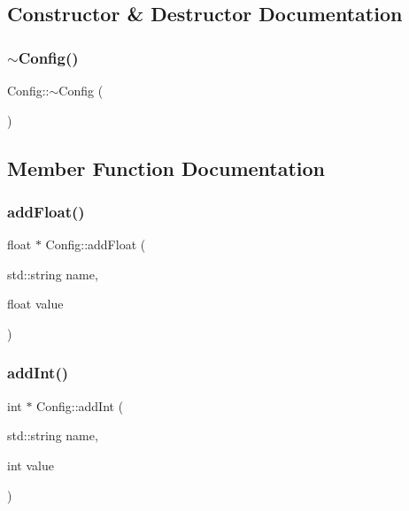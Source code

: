 \subsection{Constructor \& Destructor Documentation}
\hypertarget{class_mason_1_1_config_a543dce59b66475c5108088ee4ce1cdfc}{}\label{class_mason_1_1_config_a543dce59b66475c5108088ee4ce1cdfc} 
\subsubsection{\texorpdfstring{$\sim$\+Config()}{~Config()}}
{\footnotesize\ttfamily Config\+::$\sim$\+Config (\begin{DoxyParamCaption}{ }\end{DoxyParamCaption})}



\subsection{Member Function Documentation}
\hypertarget{class_mason_1_1_config_aa34f25a92ea33607425da418efabf47f}{}\label{class_mason_1_1_config_aa34f25a92ea33607425da418efabf47f} 
\subsubsection{\texorpdfstring{add\+Float()}{addFloat()}}
{\footnotesize\ttfamily float $\ast$ Config\+::add\+Float (\begin{DoxyParamCaption}\item[{std\+::string}]{name,  }\item[{float}]{value }\end{DoxyParamCaption})\hspace{0.3cm}{\ttfamily [static]}}

\hypertarget{class_mason_1_1_config_af80adf2ed2290a3d714fb0407ee8fe55}{}\label{class_mason_1_1_config_af80adf2ed2290a3d714fb0407ee8fe55} 
\subsubsection{\texorpdfstring{add\+Int()}{addInt()}}
{\footnotesize\ttfamily int $\ast$ Config\+::add\+Int (\begin{DoxyParamCaption}\item[{std\+::string}]{name,  }\item[{int}]{value }\end{DoxyParamCaption})\hspace{0.3cm}{\ttfamily [static]}}

